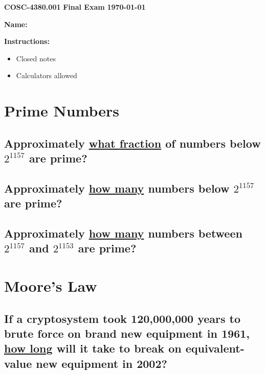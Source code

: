 \documentclass[12pt]{article}
\begin{document}
\noindent \Large \textbf{COSC-4380.001}  \hfill \textbf{Final Exam}  \hfill \textbf{\today}\\

\vspace{0cm}

\textbf{Name:}
\hrulefill

\vspace{0.2cm}
\Large
\textbf{Instructions:}
\begin{itemize}
    \item Closed notes
    \item Calculators allowed
\end{itemize}


\section{Prime Numbers}

\subsection{Approximately \underline{what fraction} of numbers below $2^{1157}$ are prime?}

\vspace{7cm}

\subsection{Approximately \underline{how many} numbers below $2^{1157}$ are prime?}

\newpage

\subsection{Approximately \underline{how many} numbers between $2^{1157}$ and $2^{1153}$ are prime?}

\vspace{8cm}

\section{Moore's Law}

\subsection{If a cryptosystem took 120,000,000 years to brute force on brand new equipment in 1961, \underline{how long} will it take to break on equivalent-value new equipment in 2002?}
\end{document}
